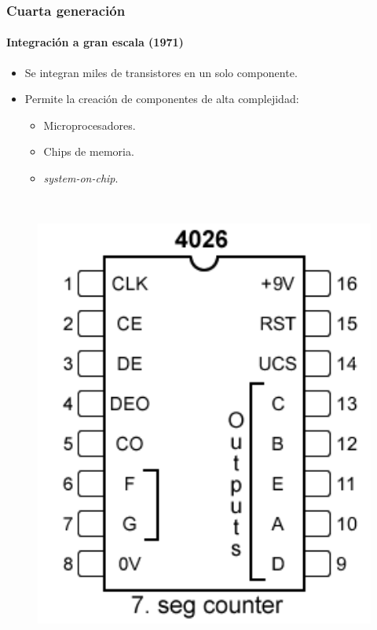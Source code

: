 \documentclass[11pt,a4paper,spanish]{beamer}
\begin{document}
\begin{frame}

\frametitle{Cuarta generación}
\framesubtitle{Integración a gran escala (1971)}

\begin{minipage}{0.66\textwidth}
\begin{itemize}
    \item Se integran miles de transistores en un solo componente.
    \item Permite la creación de componentes de alta complejidad:
        \begin{itemize}
            \item Microprocesadores.
            \item Chips de memoria.
            \item \emph{system-on-chip}.
        \end{itemize}
\end{itemize}
\end{minipage}
~
\begin{minipage}{0.3\textwidth}
\begin{figure}
    \includegraphics[width=1.0\textwidth]{img/4026-chip.png}
    \captionsetup{textfont=tiny,labelformat=empty}
    \caption{\ccbysa\cite{4026-chip}}
\end{figure}
\end{minipage}

\end{frame}
\end{document}
